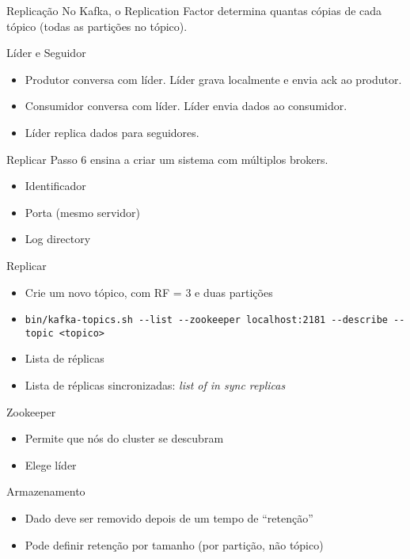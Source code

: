 \begin{frame}{Replicação}
No Kafka, o \alert{Replication Factor} determina quantas cópias de cada tópico (todas as partições no tópico).
\end{frame}

\begin{frame}{Líder e Seguidor}
\begin{itemize}
	\item Produtor conversa com líder. Líder grava localmente e envia ack ao produtor.
	\item Consumidor conversa com líder. Líder envia dados ao consumidor.
	\item Líder replica dados para seguidores.
\end{itemize}
\end{frame}

\begin{frame}{Replicar}
Passo 6  ensina a criar um sistema com múltiplos brokers.

\begin{itemize}
	\item Identificador
	\item Porta (mesmo servidor)
	\item \alert{Log directory}
\end{itemize}
\end{frame}

\begin{frame}{Replicar}
\begin{itemize}
	\item Crie um novo tópico, com RF = 3 e duas partições
	\item \lstinline|bin/kafka-topics.sh --list --zookeeper localhost:2181 --describe --topic <topico>|
	\item Lista de réplicas
	\item Lista de réplicas sincronizadas: \emph{list of \alert{i}n \alert{s}ync \alert{r}eplicas}
\end{itemize}
\end{frame}


\begin{frame}{Zookeeper}
\begin{itemize}
	\item Permite que nós do cluster se descubram
	\item Elege líder
\end{itemize}
\end{frame}

\begin{frame}{Armazenamento}
\begin{itemize}
	\item Dado deve ser removido depois de um tempo de ``retenção''
	\item Pode definir retenção por tamanho (por partição, não tópico)
\end{itemize}
\end{frame}


